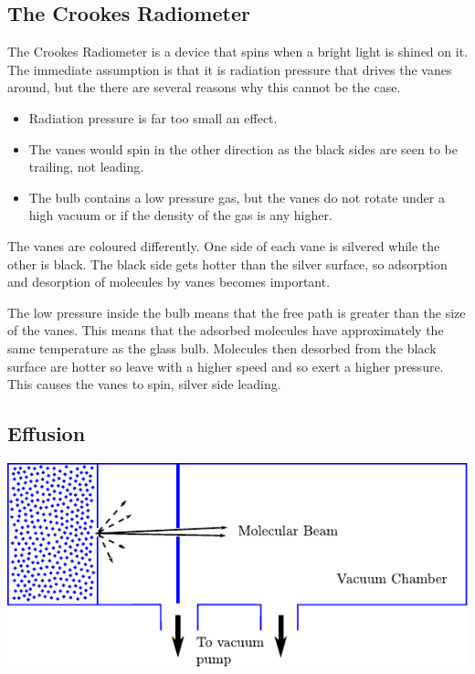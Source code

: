 \documentclass[british]{article}
\begin{document}
\subsection{The Crookes Radiometer}
The Crookes Radiometer is a device that spins when a bright light is shined on it. The immediate assumption is that it is radiation pressure that drives the vanes around, but the there are several reasons why this cannot be the case.
\begin{itemize}
	\item Radiation pressure is far too small an effect.
	\item The vanes would spin in the other direction as the black sides are seen to be trailing, not leading.
	\item The bulb contains a low pressure gas, but the vanes do not rotate under a high vacuum or if the density of the gas is any higher.
\end{itemize} 
The vanes are coloured differently. One side of each vane is silvered while the other is black. The black side gets hotter than the silver surface, so adsorption and desorption of molecules by vanes becomes important.

The low pressure inside the bulb means that the free path is greater than the size of the vanes. This means that the adsorbed molecules have approximately the same temperature as the glass bulb. Molecules then desorbed from the black surface are hotter so leave with a higher speed and so exert a higher pressure. This causes the vanes to spin, silver side leading.

\subsection{Effusion}


\begin{minipage}[t]{1\columnwidth}%
\noindent \begin{center}
\includegraphics{"Statistical Physics and Entropy/effusion"}
\par\end{center}%
\end{minipage}
\end{document}
